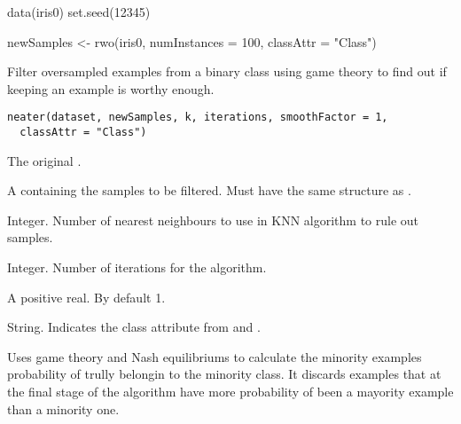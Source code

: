 %
\begin{Examples}
\begin{ExampleCode}
data(iris0)
set.seed(12345)

newSamples <- rwo(iris0, numInstances = 100, classAttr = "Class")

\end{ExampleCode}
\end{Examples}
%
\begin{Description}\relax
Filter oversampled examples from a binary class  using game
theory to find out if keeping an example is worthy enough.
\end{Description}
%
\begin{Usage}
\begin{verbatim}
neater(dataset, newSamples, k, iterations, smoothFactor = 1,
  classAttr = "Class")
\end{verbatim}
\end{Usage}
%
\begin{Arguments}
\begin{ldescription}
\item[\code{dataset}] The original .

\item[\code{newSamples}] A  containing the samples to be filtered.
Must have the same structure as .

\item[\code{k}] Integer. Number of nearest neighbours to use in KNN algorithm to
rule out samples.

\item[\code{iterations}] Integer. Number of iterations for the algorithm.

\item[\code{smoothFactor}] A positive real. By default 1.

\item[\code{classAttr}] String. Indicates the class attribute from 
and .
\end{ldescription}
\end{Arguments}
%
\begin{Details}\relax
Uses game theory and Nash equilibriums to calculate the minority examples
probability of trully belongin to the minority class. It discards examples
that at the final stage of the algorithm have more probability of been a
mayority example than a minority one.
\end{Details}
